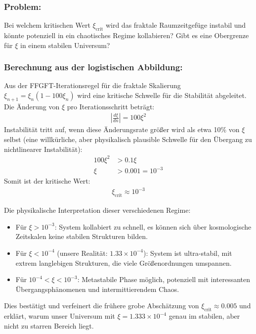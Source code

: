 \subsubsection*{Problem:}
Bei welchem kritischen Wert $\xi_{\text{crit}}$ wird das fraktale Raumzeitgefüge instabil und könnte potenziell in ein chaotisches Regime kollabieren? Gibt es eine Obergrenze für $\xi$ in einem stabilen Universum?

\subsubsection*{Berechnung aus der logistischen Abbildung:}

Aus der FFGFT-Iterationsregel für die fraktale Skalierung $\xi_{n+1} = \xi_n (1 - 100\xi_n)$ wird eine kritische Schwelle für die Stabilität abgeleitet. Die Änderung von $\xi$ pro Iterationsschritt beträgt:
\begin{align*}
	\left|\frac{d\xi}{dn}\right| = 100\xi^2
\end{align*}
Instabilität tritt auf, wenn diese Änderungsrate größer wird als etwa 10\% von $\xi$ selbst (eine willkürliche, aber physikalisch plausible Schwelle für den Übergang zu nichtlinearer Instabilität):
\begin{align*}
	100\xi^2 &> 0.1\xi \\
	\xi &> 0.001 = 10^{-3}
\end{align*}
Somit ist der kritische Wert:
\begin{align*}
	\boxed{\xi_{\text{crit}} \approx 10^{-3}}
\end{align*}

Die physikalische Interpretation dieser verschiedenen Regime:
\begin{itemize}
	\item Für $\xi > 10^{-3}$: System kollabiert zu schnell, es können sich über kosmologische Zeitskalen keine stabilen Strukturen bilden.
	\item Für $\xi < 10^{-4}$ (unsere Realität: $1.33\times10^{-4}$): System ist ultra-stabil, mit extrem langlebigen Strukturen, die viele Größenordnungen umspannen.
	\item Für $10^{-4} < \xi < 10^{-3}$: Metastabile Phase möglich, potenziell mit interessanten Übergangsphänomenen und intermittierendem Chaos.
\end{itemize}
Dies bestätigt und verfeinert die frühere grobe Abschätzung von $\xi_{\text{crit}} \approx 0.005$ und erklärt, warum unser Universum mit $\xi = 1.333\times10^{-4}$ genau im stabilen, aber nicht zu starren Bereich liegt.

